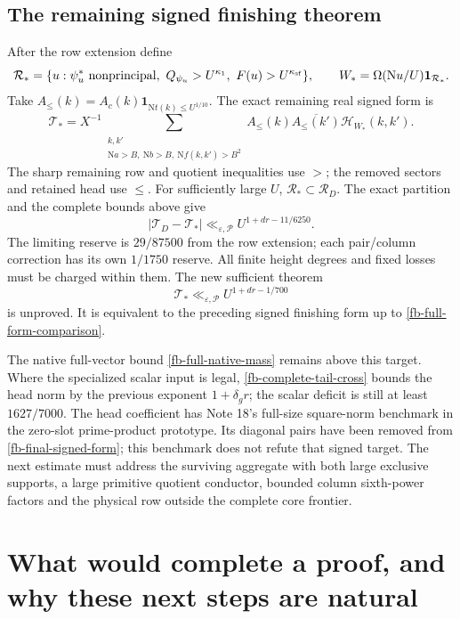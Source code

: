 \documentclass[11pt]{article}
\theoremstyle{definition}
\newcommand{\N}{\mathrm N}
\newcommand{\eps}{\varepsilon}
\newcommand{\Id}{\mathbf 1}
\newcommand{\lls}{\ll_{\eps,\mathcal P}}
\begin{document}
\subsection{The remaining signed finishing theorem}
After the row extension define
\[
 \mathcal R_*=\{u:\psi_u^*\ {\rm nonprincipal},\
 Q_{\psi_u}>U^{\kappa_1},\ F(u)>U^{\kappa_{\rm sf}}\},
 \qquad W_*=\Omega(\N u/U)\Id_{\mathcal R_*}.
\]
Take $A_\le(k)=A_c(k)\Id_{\N t(k)\le U^{1/10}}$.
The exact remaining real signed form is
\begin{equation}\label{fb-final-signed-form}
 \mathcal T_*=
 X^{-1}\!\!\sum_{\substack{k,k'\\
       \N a>B,\ \N b>B,\ \N f(k,k')>B^2}}
 A_\le(k)\overline{A_\le(k')}\mathcal H_{W_*}(k,k').
\end{equation}
The sharp remaining row and quotient inequalities use $>$; the
removed sectors and retained head use $\le$.
For sufficiently large $U$, $\mathcal R_*\subset\mathcal R_D$.
The exact partition and the complete bounds above give
\begin{equation}\label{fb-full-form-comparison}
 |\mathcal T_D-\mathcal T_*|
       \lls U^{1+dr-11/6250}.
\end{equation}
The limiting reserve is $29/87500$ from the row extension; each
pair/column correction has its own $1/1750$ reserve.
All finite height degrees and fixed losses must be charged within them.
The new sufficient theorem
\begin{equation}\label{fb-unproved-target}
 \mathcal T_*\lls U^{1+dr-1/700}
\end{equation}
is unproved. It is equivalent to the preceding signed finishing form
up to \eqref{fb-full-form-comparison}.

The native full-vector bound \eqref{fb-full-native-mass} remains above
this target. Where the specialized scalar input is legal,
\eqref{fb-complete-tail-cross} bounds the head norm by the previous
exponent $1+\delta_g r$; the scalar deficit is still at least
$1627/7000$. The head coefficient has Note 18's full-size square-norm
benchmark in the zero-slot prime-product prototype. Its diagonal
pairs have been removed from \eqref{fb-final-signed-form}; this
benchmark does not refute that signed target.
The next estimate must address the surviving aggregate with both
large exclusive supports, a large primitive quotient conductor,
bounded column sixth-power factors and the physical row outside
the complete core frontier.


\section{What would complete a proof, and why these next steps are natural}\label{sec-roadmap}
\end{document}
